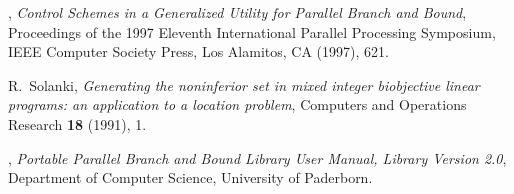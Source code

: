 \begin{thebibliography}{9}
, {\em
Control Schemes in a Generalized Utility for Parallel Branch and
Bound}, Proceedings of the 1997 Eleventh International Parallel
Processing Symposium, IEEE Computer Society Press, Los Alamitos, CA
(1997), 621.




{\sc R.~Solanki},
{\em Generating the noninferior set in mixed integer biobjective linear
  programs: an application to a location problem},
Computers and Operations Research \textbf{18} (1991), 1.

, {\em Portable
Parallel Branch and Bound Library User Manual, Library Version 2.0},
Department of Computer Science, University of Paderborn.


\end{thebibliography}
